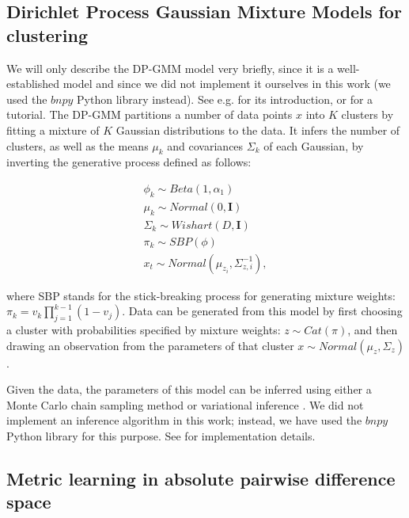 \subsection{Dirichlet Process Gaussian Mixture Models for clustering}

We will only describe the DP-GMM model very briefly, since it is a well-established model and since we did not implement it ourselves in this work (we used the $bnpy$ Python library instead). See e.g. \citep{rasmussen1999infinite} for its introduction, or \citep{gershman2012tutorial} for a tutorial. The DP-GMM partitions a number of data points $x$ into $K$ clusters by fitting a mixture of $K$ Gaussian distributions to the data. It infers the number of clusters, as well as the means $\mu_k$ and covariances $\Sigma_k$ of each Gaussian, by inverting the generative process defined as follows:
 
\begin{equation}
\label{eq:dpgmm}
\begin{array}{rcl}
\phi_k   \sim Beta(1, \alpha_1) \\
\mu_k    \sim Normal(0,  \mathbf{I}) \\
\Sigma_k \sim Wishart(D, \mathbf{I}) \\
\pi_{k}  \sim SBP(\phi) \\
x_t \sim Normal(\mu_{z_i},  \Sigma_{z,i}^{-1}),
\end{array}
\end{equation}

where SBP stands for the stick-breaking process for generating mixture weights: $\pi_k=v_k \prod_{j=1}^{k-1} (1-v_j)$. Data can be generated from this model by first choosing a cluster with probabilities specified by mixture weights: $z \sim Cat(\pi)$, and then drawing an observation from the parameters of that cluster $x \sim Normal(\mu_z, \Sigma_z)$.

Given the data, the parameters of this model can be inferred using either a Monte Carlo chain sampling method \citep{neal2000markov} or variational inference \citep{blei2006variational}. We did not implement an inference algorithm in this work; instead, we have used the $bnpy$ Python library for this purpose. See \citep{hughes2013memoized} for implementation details.

\subsection{Metric learning in absolute pairwise difference space}

